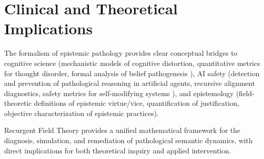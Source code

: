 \section{Clinical and Theoretical Implications}
\label{sec:clinical_and_theoretical_implications}

The formalism of epistemic pathology provides clear conceptual bridges to cognitive science (mechanistic models of cognitive distortion, quantitative metrics for thought disorder, formal analysis of belief pathogenesis \autocite{Crick1990, Dehaene2014}), AI safety (detection and prevention of pathological reasoning in artificial agents, recursive alignment diagnostics, safety metrics for self-modifying systems \autocite{RussellDeweyTegmark2016}), and epistemology (field-theoretic definitions of epistemic virtue/vice, quantification of justification, objective characterization of epistemic practices).

Recurgent Field Theory provides a unified mathematical framework for the diagnosis, simulation, and remediation of pathological semantic dynamics, with direct implications for both theoretical inquiry and applied intervention. 